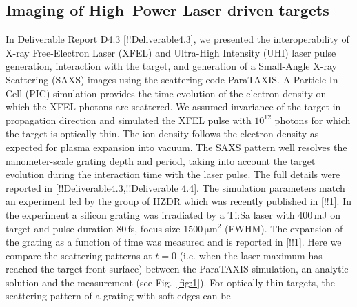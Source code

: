 \documentclass[10pt]{scrartcl}
\begin{document}
\subsection{Imaging of High--Power Laser driven targets\label{sec:high_power_imaging}}
In Deliverable Report D4.3 [!!Deliverable4.3], we presented the interoperability
of X-ray Free-Electron Laser (XFEL) and Ultra-High Intensity (UHI) laser pulse
generation, interaction with the target, and generation of a Small-Angle X-ray
Scattering (SAXS) images using the scattering code ParaTAXIS.  A Particle In
Cell (PIC) simulation provides the time evolution of the electron density on
which the XFEL photons are scattered.  We assumed invariance of the target in
propagation direction and simulated the XFEL pulse with $10^{12}$ photons for
which the target is optically thin.  The ion density follows the electron
density as expected for plasma expansion into vacuum.  The SAXS pattern well
resolves the nanometer-scale grating depth and period, taking into account the
target evolution during the interaction time with the laser pulse.  The full
details were reported in [!!Deliverable4.3,!!Deliverable 4.4].  The simulation
parameters match an experiment led by the group of HZDR which was recently
published in [!!1].  In the experiment a silicon grating was irradiated by a
Ti:Sa laser with $400$\,mJ on target and pulse duration $80$\,fs, focus size
$1500\,\mathrm{\mu m^2}$ (FWHM).  The expansion of the grating as a function of
time was measured and is reported in [!!1].
%
Here we compare the scattering patterns at $t=0$ (i.e. when the laser maximum
has reached the target front surface) between the ParaTAXIS simulation, an
analytic solution and the measurement (see Fig.~\ref{fig:1}).  For optically
thin targets, the scattering pattern of a grating with soft edges can be
\end{document}

